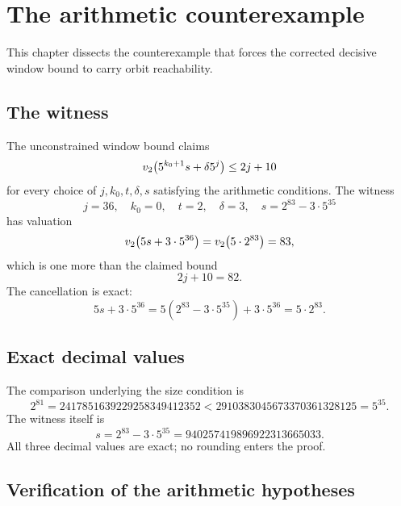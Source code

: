 \section{The arithmetic counterexample}

This chapter dissects the counterexample that forces the corrected
decisive window bound to carry orbit reachability.

\subsection{The witness}

The unconstrained window bound claims
\begin{equation*}
  v_2\!\left(5^{k_0+1}s+\delta5^j\right)\le2j+10
\end{equation*}
for every choice of $j,k_0,t,\delta,s$ satisfying the arithmetic
conditions.  The witness
\begin{equation*}
  j=36,\quad k_0=0,\quad t=2,\quad \delta=3,\quad
  s=2^{83}-3\cdot5^{35}
\end{equation*}
has valuation
\begin{equation*}
  v_2\!\left(5s+3\cdot5^{36}\right)
    =v_2\!\left(5\cdot2^{83}\right)
    =83,
\end{equation*}
which is one more than the claimed bound
\begin{equation*}
  2j+10=82.
\end{equation*}
The cancellation is exact:
\begin{equation*}
  5s+3\cdot5^{36}
    =5\left(2^{83}-3\cdot5^{35}\right)+3\cdot5^{36}
    =5\cdot2^{83}.
\end{equation*}

\subsection{Exact decimal values}

The comparison underlying the size condition is
\begin{equation*}
  2^{81}=2417851639229258349412352
  <
  2910383045673370361328125=5^{35}.
\end{equation*}
The witness itself is
\begin{equation*}
  s=2^{83}-3\cdot5^{35}=940257419896922313665033.
\end{equation*}
All three decimal values are exact; no rounding enters the proof.

\subsection{Verification of the arithmetic hypotheses}

